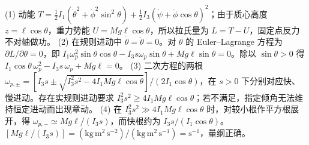 (1) 动能 \(T=\frac12I_1(\dot\theta^2+\dot\phi^2\sin^2\theta)+\frac12I_3(\dot\psi+\dot\phi\cos\theta)^2\)；由于质心高度 \(z=\ell\cos\theta\)，重力势能 \(U=Mg\ell\cos\theta\)，所以拉氏量为 \(L=T-U\)，固定点反力不对轴做功。
(2) 在规则进动中 \(\dot\theta=\ddot\theta=0\)。对 \(\theta\) 的 Euler–Lagrange 方程为 \(\partial L/\partial\theta=0\)，即 \(I_1\omega_p^2\sin\theta\cos\theta-I_3s\omega_p\sin\theta+Mg\ell\sin\theta=0\)。除以 \(\sin\theta>0\) 得 \(I_1\cos\theta\,\omega_p^2-I_3s\,\omega_p+Mg\ell=0\)。
(3) 二次方程的两根 \(\omega_{p,\pm}=[I_3s\pm\sqrt{I_3^2s^2-4I_1Mg\ell\cos\theta}]/(2I_1\cos\theta)\)，在 \(s>0\) 下分别对应快、慢进动。存在实规则进动要求 \(I_3^2s^2\ge4I_1Mg\ell\cos\theta\)；若不满足，指定倾角无法维持恒定进动而出现章动。
(4) 在 \(I_3^2s^2\gg4I_1Mg\ell\cos\theta\) 时，对较小根作平方根展开，得 \(\omega_{p,-}\simeq Mg\ell/(I_3s)\)，而快根约为 \(I_3s/(I_1\cos\theta)\)。\([Mg\ell/(I_3s)]=(\mathrm{kg\,m^2\,s^{-2}})/(\mathrm{kg\,m^2\,s^{-1}})=\mathrm{s^{-1}}\)，量纲正确。
